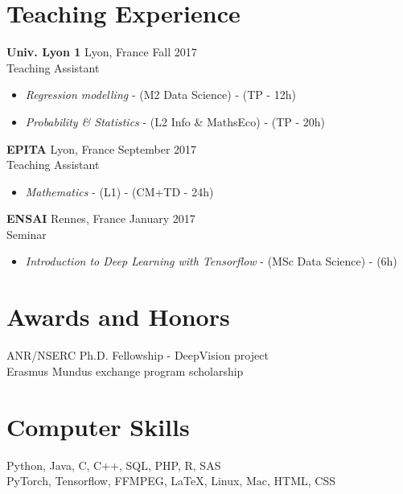 \documentclass[10pt]{res} %
\begin{document}
\begin{resume}

\section{\large Teaching Experience} 
\textbf{Univ. Lyon 1} \hfill Lyon, France \hfill Fall 2017 \\
Teaching Assistant
\begin{itemize}
	\item \textit{Regression modelling}  - (M2 Data Science) - (TP - 12h)
	\item \textit{Probability \& Statistics}  - (L2 Info \& MathsEco) - (TP - 20h)
\end{itemize}

\textbf{EPITA} \hfill Lyon, France \hfill September 2017 \\
Teaching Assistant
\begin{itemize}
	\item \textit{Mathematics} - (L1) - (CM+TD - 24h)
\end{itemize}

\textbf{ENSAI} \hfill Rennes, France \hfill January 2017 \\
Seminar
\begin{itemize}
\item \textit{Introduction to Deep Learning with Tensorflow} - (MSc Data Science) - (6h)
\end{itemize}


\section{\large Awards and Honors} 
ANR/NSERC Ph.D. Fellowship - DeepVision project \\
Erasmus Mundus exchange program scholarship


\section{\large Computer Skills} 
Python, Java, C, C++, SQL, PHP, R, SAS \\
PyTorch, Tensorflow, FFMPEG, \LaTeX, Linux, Mac, HTML, CSS



\end{resume}
\end{document}

